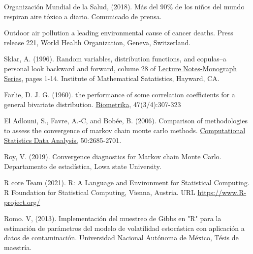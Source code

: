 \begin{thebibliography}{X}
 Organización Mundial de la Salud, (2018). Más del $90\%$ de los niños del mundo respiran aire tóxico a diario. Comunicado de prensa. 

 Outdoor air pollution a leading environmental cause of cancer deaths. Press release 221, World Health Organization, Geneva, Switzerland. 


 Sklar, A. (1996). Random variables, distribution functions, and copulas--a personal look backward and forward, colume 28 of \underline{Lecture Notes-Monograph Series}, pages 1-14. Institute of Mathematical Satatistics, Hayward, CA. 

 Farlie, D. J. G. (1960). the performance of some correlation coefficients for a general bivariate distribution. \underline{Biometrika}, 47(3/4):307-323

 El Adlouni, S., Favre, A.-C, and Bobée, B. (2006). Comparison of methodologies to assess the convergence of markov chain monte carlo methods. \underline{Computational Statistics Data Analysis,} 50:2685-2701.


 Roy, V. (2019). Convergence diagnostics for Markov chain Monte Carlo. Departamento de estadística, Lowa state University.

 R core Team (2021). R: A Language and Environment for Statistical Computing. R Foundation for Statistical Computing, Vienna, Austria. URL \url{https://www.R-project.org/}

 Romo. V, (2013). Implementación del muestreo de Gibbs en "R" para la estimación de parámetros del modelo de volatilidad estocástica con aplicación a datos de contaminación. Universidad Nacional Autónoma de México, Tésis de maestría.  

\end{thebibliography}




